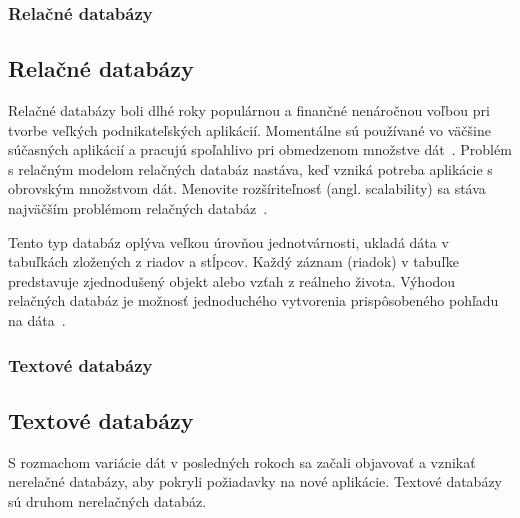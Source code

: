 %
%
{
	\subsubsection{Relačné databázy}
}
{
	\subsection{Relačné databázy}
}
\label{subsubsection:relation_dbs}
Relačné databázy boli dlhé roky populárnou a finančné nenáročnou voľbou pri tvorbe veľkých podnikateľských aplikácií. Momentálne sú používané vo väčšine súčasných aplikácií a pracujú spoľahlivo pri obmedzenom množstve dát~\cite{MongoDBvsMySQL2015}. Problém s relačným modelom relačných databáz nastáva, keď vzniká potreba aplikácie s obrovským množstvom dát. Menovite rozšíriteľnosť (angl. scalability) sa stáva najväčším problémom relačných databáz~\cite{NoSQLDBvsRealtionDB}.

Tento typ databáz oplýva veľkou úrovňou jednotvárnosti, ukladá dáta v tabuľkách zložených z riadov a stĺpcov. Každý záznam (riadok) v tabuľke predstavuje zjednodušený objekt alebo vzťah z reálneho života. Výhodou relačných databáz je možnosť jednoduchého vytvorenia prispôsobeného pohľadu na dáta~\cite{Maier}.

%
%
{
	\subsubsection{Textové databázy}
}
{
	\subsection{Textové databázy}
}
\label{subsubsection:text_dbs}
S rozmachom variácie dát v posledných rokoch sa začali objavovať a vznikať nerelačné databázy, aby pokryli požiadavky na nové aplikácie. Textové databázy sú druhom nerelačných databáz.

